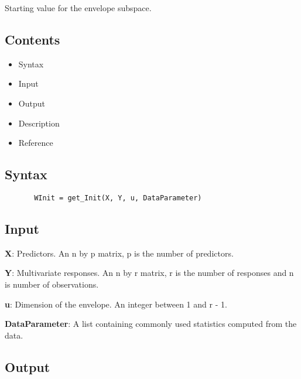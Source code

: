 \documentclass[a4paper,11pt,openany]{memoir}
\begin{document}
\begin{par}
Starting value for the envelope subspace.
\end{par} \vspace{1em}

\subsection*{Contents}

\begin{itemize}
\setlength{\itemsep}{-1ex}
   \item Syntax
   \item Input
   \item Output
   \item Description
   \item Reference
\end{itemize}


\subsection*{Syntax}


\begin{verbatim}       WInit = get_Init(X, Y, u, DataParameter)\end{verbatim}
    

\subsection*{Input}

\begin{par}
\textbf{X}: Predictors. An n by p matrix, p is the number of predictors.
\end{par} \vspace{1em}
\begin{par}
\textbf{Y}: Multivariate responses. An n by r matrix, r is the number of responses and n is number of observations.
\end{par} \vspace{1em}
\begin{par}
\textbf{u}: Dimension of the envelope. An integer between 1 and r - 1.
\end{par} \vspace{1em}
\begin{par}
\textbf{DataParameter}: A list containing commonly used statistics computed from the data.
\end{par} \vspace{1em}


\subsection*{Output}
\end{document}
